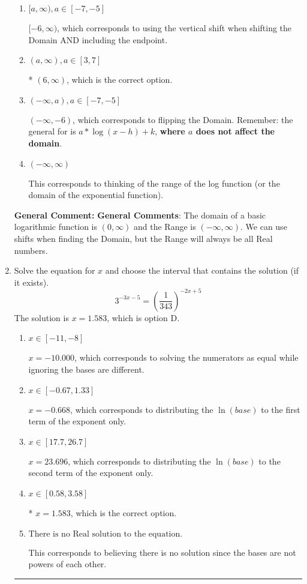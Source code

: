 \documentclass{extbook}[14pt]
\newcommand{\litem}[1]{\item #1

\rule{\textwidth}{0.4pt}}
\begin{document}
\begin{enumerate}
{\begin{enumerate}[label=\Alph*.]
$(-\infty, 6]$, which corresponds to using the negative vertical shift AND including the endpoint AND flipping the domain.
\item \( [a, \infty), a \in [-7, -5] \)

$[-6, \infty)$, which corresponds to using the vertical shift when shifting the Domain AND including the endpoint.
\item \( (a, \infty), a \in [3, 7] \)

* $(6, \infty)$, which is the correct option.
\item \( (-\infty, a), a \in [-7, -5] \)

$(-\infty, -6)$, which corresponds to flipping the Domain. Remember: the general for is $a*\log(x-h)+k$, \textbf{where $a$ does not affect the domain}.
\item \( (-\infty, \infty) \)

This corresponds to thinking of the range of the log function (or the domain of the exponential function).
\end{enumerate}

\textbf{General Comment:} \textbf{General Comments}: The domain of a basic logarithmic function is $(0, \infty)$ and the Range is $(-\infty, \infty)$. We can use shifts when finding the Domain, but the Range will always be all Real numbers.
}
\litem{
Solve the equation for $x$ and choose the interval that contains the solution (if it exists).
\[ 3^{-3x-5} = \left(\frac{1}{343}\right)^{-2x+5} \]The solution is \( x = 1.583 \), which is option D.\begin{enumerate}[label=\Alph*.]
\item \( x \in [-11, -8] \)

$x = -10.000$, which corresponds to solving the numerators as equal while ignoring the bases are different.
\item \( x \in [-0.67, 1.33] \)

$x = -0.668$, which corresponds to distributing the $\ln(base)$ to the first term of the exponent only.
\item \( x \in [17.7, 26.7] \)

$x = 23.696$, which corresponds to distributing the $\ln(base)$ to the second term of the exponent only.
\item \( x \in [0.58, 3.58] \)

* $x = 1.583$, which is the correct option.
\item \( \text{There is no Real solution to the equation.} \)

This corresponds to believing there is no solution since the bases are not powers of each other.
\end{enumerate}

}
\end{enumerate}
\end{document}
